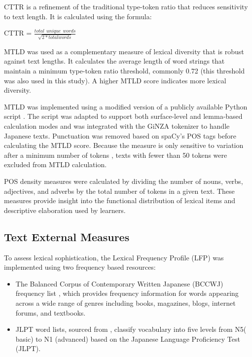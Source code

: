 CTTR is a refinement of the traditional type-token ratio that reduces sensitivity to text length. It is calculated
using the formula:
\begin{center}
    \centering CTTR = ${\displaystyle \frac{total \hspace{5pt} unique\hspace{5pt} words}{\sqrt{2*total words}} } $
\end{center}
\vspace{5pt}

MTLD was used as a complementary measure of lexical diversity that is robust against text lengths. It calculates the
average length of word strings that maintain a minimum type-token ratio threshold, commonly 0.72 (this threshold was
also used in this study). A higher
MTLD
score indicates more lexical diversity.

MTLD was implemented using a modified version of a
publicly
available
Python script \citep{MTLD_repo}. The script was adapted to support both surface-level and lemma-based calculation
modes and was integrated with the GiNZA tokenizer to handle Japanese texts. Punctuation was removed based on
spaCy's POS tags before
calculating the MTLD score. Because the measure is only sensitive to variation after a minimum number of tokens \citep{McCarthy2010},
texts with fewer than 50 tokens were excluded from MTLD calculation.

POS density measures were calculated by dividing the number of nouns, verbs, adjectives, and
adverbs by the total
number of tokens in a given text. These measures provide insight into the functional distribution of lexical items and
descriptive elaboration used by learners.


\subsection{Text External Measures}
To assess lexical sophistication, the Lexical Frequency Profile (LFP) was implemented using two frequency based
resources:
\begin{itemize}
    \item The Balanced Corpus of Contemporary Written Japanese (BCCWJ) frequency list \citep{maekawa2014}, which
    provides frequency information for words appearing across a wide range of genres including books, magazines,
    blogs,
    internet
    forums, and textbooks.
    \item JLPT word lists, sourced from \citep{jisho.org}, classify vocabulary into five levels from N5(
    basic) to N1 (advanced) based on the Japanese Language Proficiency Test (JLPT).
    \end{itemize}

